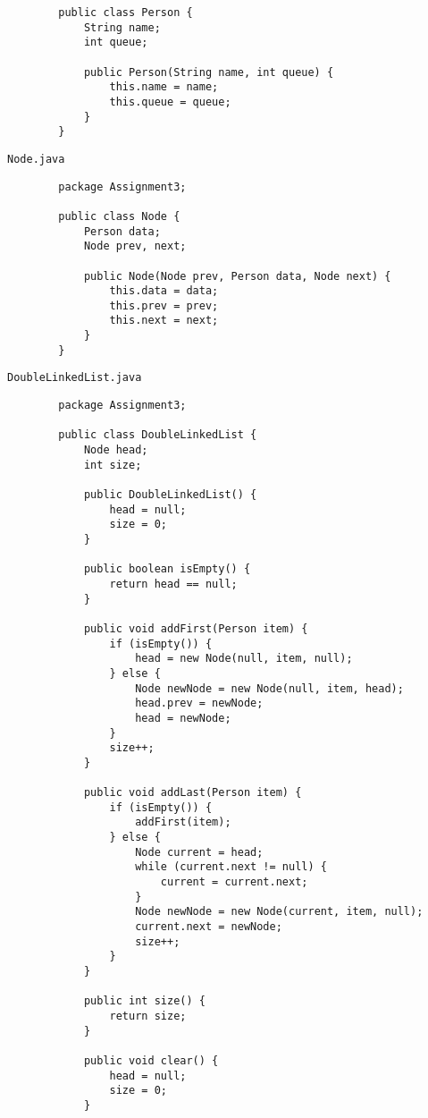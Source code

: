 \documentclass[12pt,titlepage]{article}
\begin{document}
\begin{enumerate}
\begin{verbatim}
        public class Person {
            String name;
            int queue;

            public Person(String name, int queue) {
                this.name = name;
                this.queue = queue;
            }
        }
    \end{verbatim}
    \texttt{Node.java}
    \begin{verbatim}
        package Assignment3;

        public class Node {
            Person data;
            Node prev, next;

            public Node(Node prev, Person data, Node next) {
                this.data = data;
                this.prev = prev;
                this.next = next;
            }
        }
    \end{verbatim}
    \texttt{DoubleLinkedList.java}
    \begin{verbatim}
        package Assignment3;

        public class DoubleLinkedList {
            Node head;
            int size;

            public DoubleLinkedList() {
                head = null;
                size = 0;
            }

            public boolean isEmpty() {
                return head == null;
            }

            public void addFirst(Person item) {
                if (isEmpty()) {
                    head = new Node(null, item, null);
                } else {
                    Node newNode = new Node(null, item, head);
                    head.prev = newNode;
                    head = newNode;
                }
                size++;
            }

            public void addLast(Person item) {
                if (isEmpty()) {
                    addFirst(item);
                } else {
                    Node current = head;
                    while (current.next != null) {
                        current = current.next;
                    }
                    Node newNode = new Node(current, item, null);
                    current.next = newNode;
                    size++;
                }
            }

            public int size() {
                return size;
            }

            public void clear() {
                head = null;
                size = 0;
            }


\end{verbatim}
\end{enumerate}
\end{document}
